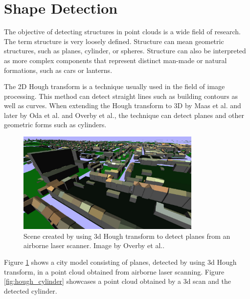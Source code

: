 \section {Shape Detection}

The objective of detecting structures in point clouds is a wide field of research. The term structure is very loosely defined. Structure can mean geometric structures, such as planes, cylinder, or spheres. Structure can also be interpreted as more complex components that represent distinct man-made or natural formations, such as cars or lanterns. 

The 2D Hough transform\cite{hough1962method} is a technique usually used in the field of image processing. This method can detect straight lines such as building contours as well as curves. When extending the Hough transform to 3D by Maas et al.\cite{maas1999two} and later by Oda et al.\cite{oda2004automatic} and Overby et al.\cite{overby2004automatic}, the technique can detect planes and other geometric forms such as cylinders\cite{rabbani2005efficient}. 

\begin{figure}
    \centering
    \includegraphics[width=0.81\textwidth]{Related_Work/hough_planes.png}%
    \caption{Scene created by using 3d Hough transform to detect planes from an airborne laser scanner. Image by Overby et al.\cite{overby2004automatic}.}
    \label{fig:hough_planes}
\end{figure}

Figure \ref{fig:hough_planes} shows a city model consisting of planes, detected by using 3d Hough transform, in a point cloud obtained from airborne laser scanning. Figure \ref{fig:hough_cylinder} showcases a point cloud obtained by a 3d scan and the detected cylinder. 

